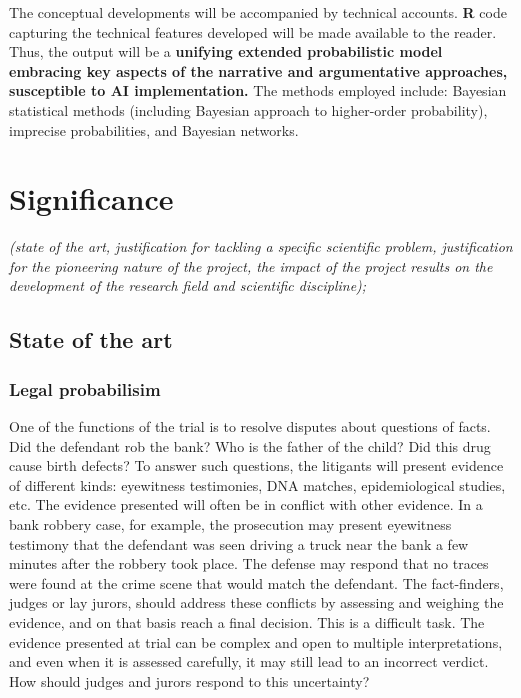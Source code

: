 \documentclass[11pt,dvipsnames,enabledeprecatedfontcommands]{scrartcl}
\begin{document}
The conceptual developments will be accompanied by technical accounts.
\textbf{\textsf{R}} code capturing the technical features developed will
be made available to the reader. Thus, the output will be a
\textbf{unifying extended probabilistic model embracing key aspects of the narrative and argumentative approaches, susceptible to AI implementation.}
The methods employed include: Bayesian statistical methods (including
Bayesian approach to higher-order probability), imprecise probabilities,
and Bayesian networks.

\newpage 

\tableofcontents

\newpage

\section{Significance}\label{significance}

\footnotesize \emph{
(state of the art, justification for tackling a specific scientific problem,
justification for the pioneering nature of the project,
the impact of the project results on the development of the research field and scientific discipline);
} \normalsize

\subsection{State of the art}\label{state-of-the-art}

\subsubsection{Legal probabilisim}\label{legal-probabilisim}

One of the functions of the trial is to resolve disputes about questions
of facts. Did the defendant rob the bank? Who is the father of the
child? Did this drug cause birth defects? To answer such questions, the
litigants will present evidence of different kinds: eyewitness
testimonies, DNA matches, epidemiological studies, etc. The evidence
presented will often be in conflict with other evidence. In a bank
robbery case, for example, the prosecution may present eyewitness
testimony that the defendant was seen driving a truck near the bank a
few minutes after the robbery took place. The defense may respond that
no traces were found at the crime scene that would match the defendant.
The fact-finders, judges or lay jurors, should address these conflicts
by assessing and weighing the evidence, and on that basis reach a final
decision. This is a difficult task. The evidence presented at trial can
be complex and open to multiple interpretations, and even when it is
assessed carefully, it may still lead to an incorrect verdict. How
should judges and jurors respond to this uncertainty?
\end{document}
